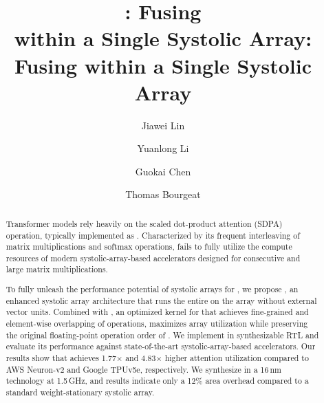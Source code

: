 \ifreview
\title[]{\MSAGA{}: Fusing \FA{} \\ within a Single Systolic Array}
\else
\title[]{\SA{}: Fusing \FA{} within a Single Systolic Array}
\fi


\author{Jiawei Lin}

\author{Yuanlong Li}

\author{Guokai Chen}

\author{Thomas Bourgeat}

\renewcommand{\shortauthors}{Jiawei et al.}

\begin{abstract}

Transformer models rely heavily on the scaled dot-product attention (SDPA) operation,
typically implemented as \FA{}.
Characterized by its frequent interleaving of matrix multiplications and softmax operations,
\FA{} fails to fully utilize the compute resources of modern systolic-array-based accelerators
designed for consecutive and large matrix multiplications.

To fully unleash the performance potential of systolic arrays for \FA{},
we propose \MSAGA{}, an enhanced systolic array architecture that runs the entire \FA{}
on the array without external vector units.
Combined with \SA{}, an optimized kernel for \MSAGA{} that achieves fine-grained and element-wise
overlapping of \FA{} operations, \MSAGA{} maximizes array utilization while preserving the
original floating-point operation order of \FA{}.
We implement \MSAGA{} in synthesizable RTL and evaluate its performance against state-of-the-art
systolic-array-based accelerators.
Our results show that \MSAGA{} achieves 1.77$\times$ and 4.83$\times$ higher attention \FLOPs{} utilization
compared to AWS Neuron-v2 and Google TPUv5e, respectively.
We synthesize \MSAGA{} in a 16\,nm technology at 1.5\,GHz, and results indicate
only a 12\% area overhead compared to a standard weight-stationary systolic array.
\end{abstract}








\maketitle
